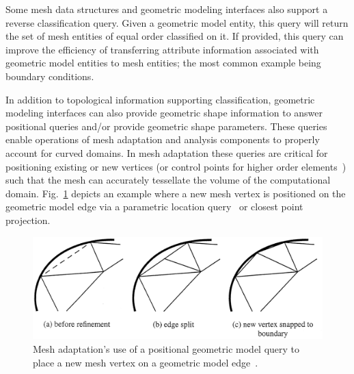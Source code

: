 Some mesh data structures and geometric modeling interfaces also support a reverse
classification query.
Given a geometric model entity, this query will return the set of mesh entities
of equal order classified on it.
If provided, this query can improve the efficiency of transferring attribute
information associated with geometric model entities to mesh entities; the most
common example being boundary conditions.

In addition to topological information supporting classification, geometric
modeling interfaces can also provide geometric shape information to answer
positional queries and/or provide geometric shape parameters.
These queries enable operations of mesh adaptation and analysis components to
properly account for curved domains.
In mesh adaptation these queries are critical for positioning existing or new
vertices (or control points for higher order elements~\cite{DeyShephard_97})
such that the mesh can accurately tessellate the volume of the computational
domain.
Fig.~\ref{fig:edgesplit} depicts an example where a new mesh vertex is
positioned on the geometric model edge via a parametric location
query~\cite{beallthesis} or closest point projection.

\begin{figure} \centering
  \includegraphics[width=.7\textwidth]{figures/edgesplit.eps}
  \caption{Mesh adaptation's use of a positional geometric model query to place a
    new mesh vertex on a geometric model edge~\cite{beallthesis}.}
  \label{fig:edgesplit}
\end{figure}

